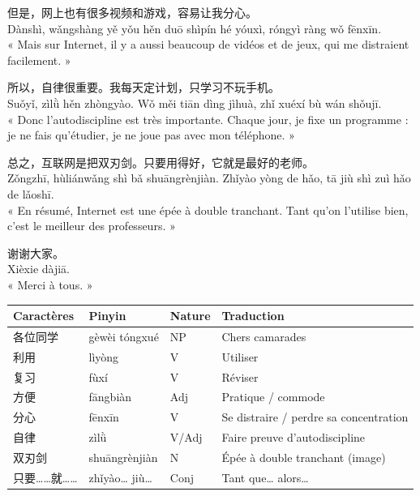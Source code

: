 \documentclass[11pt]{article}
\begin{document}
\begin{exoresolu}
但是，网上也有很多视频和游戏，容易让我分心。\\
Dànshì, wǎngshàng yě yǒu hěn duō shìpín hé yóuxì, róngyì ràng wǒ fēnxīn.\\
« Mais sur Internet, il y a aussi beaucoup de vidéos et de jeux, qui me distraient facilement. »

所以，自律很重要。我每天定计划，只学习不玩手机。\\
Suǒyǐ, zìlǜ hěn zhòngyào. Wǒ měi tiān dìng jìhuà, zhǐ xuéxí bù wán shǒujī.\\
« Donc l'autodiscipline est très importante. Chaque jour, je fixe un programme : je ne fais qu'étudier, je ne joue pas avec mon téléphone. »

总之，互联网是把双刃剑。只要用得好，它就是最好的老师。\\
Zǒngzhī, hùliánwǎng shì bǎ shuāngrènjiàn. Zhǐyào yòng de hǎo, tā jiù shì zuì hǎo de lǎoshī.\\
« En résumé, Internet est une épée à double tranchant. Tant qu'on l'utilise bien, c'est le meilleur des professeurs. »

谢谢大家。\\
Xièxie dàjiā.\\
« Merci à tous. »

\begin{center}
\begin{tabularx}{\linewidth}{|X|X|X|X|}
\hline
\rowcolor{popblueL} Caractères & Pinyin & Nature & Traduction \\
\hline
各位同学 & gèwèi tóngxué & NP & Chers camarades \\
利用 & lìyòng & V & Utiliser \\
复习 & fùxí & V & Réviser \\
方便 & fāngbiàn & Adj & Pratique / commode \\
分心 & fēnxīn & V & Se distraire / perdre sa concentration \\
自律 & zìlǜ & V/Adj & Faire preuve d'autodiscipline \\
双刃剑 & shuāngrènjiàn & N & Épée à double tranchant (image) \\
只要……就…… & zhǐyào… jiù… & Conj & Tant que… alors… \\
\hline
\end{tabularx}
\end{center}


\end{exoresolu}
\end{document}
